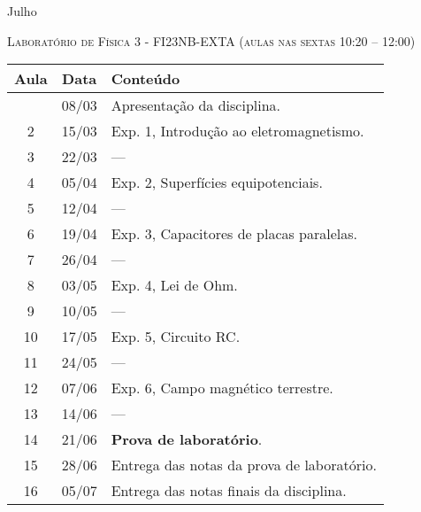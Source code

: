 %
\begin{marginfigure}
    \centering
    Julho\\
\end{marginfigure}
\vspace{1cm}
\begin{center}
\Large\textsc{Laboratório de Física 3 - FI23NB-EXTA (aulas nas sextas 10:20 -- 12:00)}
\end{center}

\begin{center}
\begin{longtable}{ccp{70mm}}
\toprule
Aula & Data & Conteúdo \\
\midrule
\endhead
\bottomrule
\endfoot
1 & 08/03 & Apresentação da disciplina. \\
2 & 15/03 & Exp. 1, Introdução ao eletromagnetismo. \\
3 & 22/03 & --- \\
4 & 05/04 & Exp. 2, Superfícies equipotenciais. \\
5 & 12/04 & --- \\
6 & 19/04 & Exp. 3, Capacitores de placas paralelas. \\
7 & 26/04 & --- \\
8 & 03/05 & Exp. 4, Lei de Ohm. \\
9 & 10/05 & --- \\
10 & 17/05 & Exp. 5, Circuito RC. \\
11 & 24/05 & --- \\
12 & 07/06 & Exp. 6, Campo magnético terrestre. \\
13 & 14/06 & --- \\
14 & 21/06 & \textbf{Prova de laboratório}. \\
15 & 28/06 & Entrega das notas da prova de laboratório. \\ 
16 & 05/07 & Entrega das notas finais da disciplina. \\
\end{longtable}
\end{center}

\cleardoublepage

